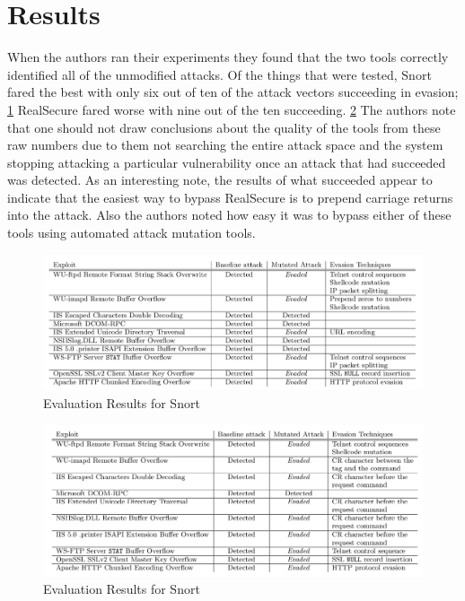 \documentclass{reading_glasses}
\begin{document}
\section{Results}
When the authors ran their experiments they found that the two tools correctly identified all of the unmodified attacks.   Of the things that were tested, Snort fared the best with only six out of ten of the attack vectors succeeding in evasion; \ref{fig:snortRes} RealSecure fared worse with nine out of the ten succeeding. \ref{fig:realSecRes}  The authors note that one should not draw conclusions about the quality of the tools from these raw numbers due to them not searching the entire attack space and the system stopping attacking a particular vulnerability once an attack that had succeeded was detected.  As an interesting note, the results of what succeeded appear to indicate that the easiest way to bypass RealSecure is to prepend carriage returns into the attack.   Also the authors noted how easy it was to bypass either of these tools using automated attack mutation tools.  \cite{vigna2004testing}

\begin{figure}
	\centering
	\includegraphics[width=1.0\textwidth]{SnortResults.png}
	\caption{Evaluation Results for Snort}
	\label{fig:snortRes}
\end{figure}

\begin{figure}
	\centering
	\includegraphics[width=1.0\textwidth]{IISRealSecureResults.png}
	\caption{Evaluation Results for Snort}
	\label{fig:realSecRes}
\end{figure}
\end{document}
